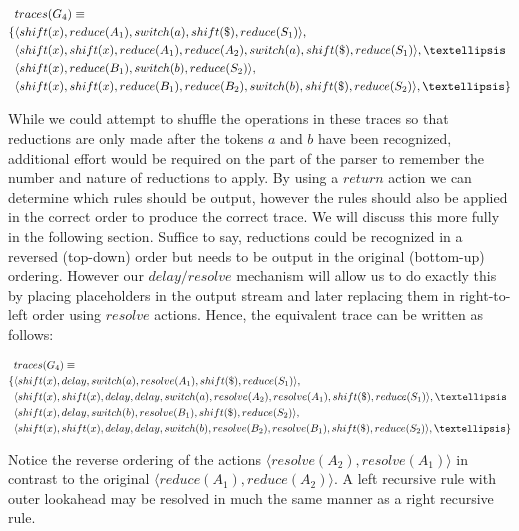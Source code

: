 \documentclass[a4paper,11pt]{article}
\begin{document}
\parbox{.3\textwidth}{\begin{align*}
&traces(G_4) \equiv \\
\{ & \langle shift(x), reduce(A_1), switch(a), shift(\$), reduce(S_1) \rangle,\\
   & \langle shift(x), shift(x), reduce(A_1), reduce(A_2), switch(a), shift(\$), reduce(S_1) \rangle, \textellipsis \\
   & \langle shift(x), reduce(B_1), switch(b), reduce(S_2) \rangle,\\
   & \langle shift(x), shift(x), reduce(B_1), reduce(B_2), switch(b), shift(\$), reduce(S_2) \rangle, \textellipsis \}
\end{align*}}

While we could attempt to shuffle the operations in these traces so that reductions are only made after the tokens $a$ and $b$ have been recognized, 
additional effort would be required on the part of the parser to remember the number and nature of reductions to apply. 
By using a $return$ action we can determine which rules should be output, however the rules should also be applied in the correct order to produce the correct trace. 
We will discuss this more fully in the following section.
Suffice to say, reductions could be recognized in a reversed (top-down) order but needs to be output in the original (bottom-up) ordering.
However our $delay/resolve$ mechanism will allow us to do exactly this by placing placeholders in the output stream and later replacing them in right-to-left order using $resolve$ actions.
Hence, the equivalent trace can be written as follows:

\parbox{.3\textwidth}{\begin{align*}
&traces(G_4) \equiv \\
\{ & \langle shift(x), delay, switch(a), resolve(A_1), shift(\$), reduce(S_1) \rangle,\\
   & \langle shift(x), shift(x), delay, delay, switch(a), resolve(A_2), resolve(A_1), shift(\$), reduce(S_1) \rangle, \textellipsis \\
   & \langle shift(x), delay, switch(b), resolve(B_1), shift(\$), reduce(S_2) \rangle,\\
   & \langle shift(x), shift(x), delay, delay, switch(b), resolve(B_2), resolve(B_1), shift(\$), reduce(S_2) \rangle, \textellipsis \}
\end{align*}}

Notice the reverse ordering of the actions $\langle resolve(A_2), resolve(A_1) \rangle$ in contrast to the original $\langle reduce(A_1), reduce(A_2) \rangle$.
A left recursive rule with outer lookahead may be resolved in much the same manner as a right recursive rule.
\end{document}
